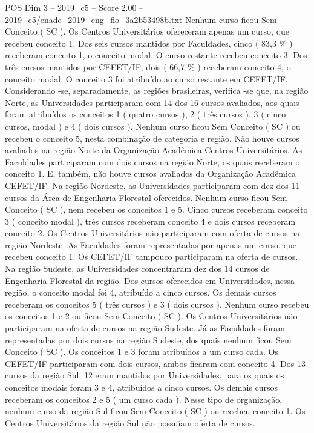\begin{textsample}{POS Dim 3 – 2019\_c5 – Score 2.00 – 2019\_c5/enade\_2019\_eng\_flo\_3a2b53498b.txt}
Nenhum curso ficou Sem Conceito ( SC ).
Os Centros Universitários ofereceram apenas um curso, que recebeu conceito 1.
Dos seis cursos mantidos por Faculdades, cinco ( 83,3 \% ) receberam conceito 1, o conceito modal.
O curso restante recebeu conceito 3.
Dos três cursos mantidos por CEFET/IF, dois ( 66,7 \% ) receberam conceito 4, o conceito modal.
O conceito 3 foi atribuído ao curso restante em CEFET/IF.
Considerando -se, separadamente, as regiões brasileiras, verifica -se que, na região Norte, as Universidades participaram com 14 dos 16 cursos avaliados, aos quais foram atribuídos os conceitos 1 ( quatro cursos ), 2 ( três cursos ), 3 ( cinco cursos, modal ) e 4 ( dois cursos ).
Nenhum curso ficou Sem Conceito ( SC ) ou recebeu o conceito 5, nesta combinação de categoria e região.
Não houve cursos avaliados na região Norte da Organização Acadêmica Centros Universitários.
As Faculdades participaram com dois cursos na região Norte, os quais receberam o conceito 1.
E, também, não houve cursos avaliados da Organização Acadêmica CEFET/IF.
Na região Nordeste, as Universidades participaram com dez dos 11 cursos da Área de Engenharia Florestal oferecidos.
Nenhum curso ficou Sem Conceito ( SC ), nem recebeu os conceitos 1 e 5.
Cinco cursos receberam conceito 3 ( conceito modal ), três cursos receberam conceito 4 e dois cursos receberam conceito 2.
Os Centros Universitários não participaram com oferta de cursos na região Nordeste.
As Faculdades foram representadas por apenas um curso, que recebeu conceito 1.
Os CEFET/IF tampouco participaram na oferta de cursos.
Na região Sudeste, as Universidades concentraram dez dos 14 cursos de Engenharia Florestal da região.
Dos cursos oferecidos em Universidades, nessa região, o conceito modal foi 4, atribuído a cinco cursos.
Os demais cursos receberam os conceitos 5 ( três cursos ) e 3 ( dois cursos ).
Nenhum curso recebeu os conceitos 1 e 2 ou ficou Sem Conceito ( SC ).
Os Centros Universitários não participaram na oferta de cursos na região Sudeste.
Já as Faculdades foram representadas por dois cursos na região Sudeste, dos quais nenhum ficou Sem Conceito ( SC ).
Os conceitos 1 e 3 foram atribuídos a um curso cada.
Os CEFET/IF participaram com dois cursos, ambos ficaram com conceito 4.
Dos 13 cursos da região Sul, 12 eram mantidos por Universidades, para os quais os conceitos modais foram 3 e 4, atribuídos a cinco cursos.
Os demais cursos receberam os conceitos 2 e 5 ( um curso cada ).
Nesse tipo de organização, nenhum curso da região Sul ficou Sem Conceito ( SC ) ou recebeu conceito 1.
Os Centros Universitários da região Sul não possuíam oferta de cursos.

\end{textsample}
